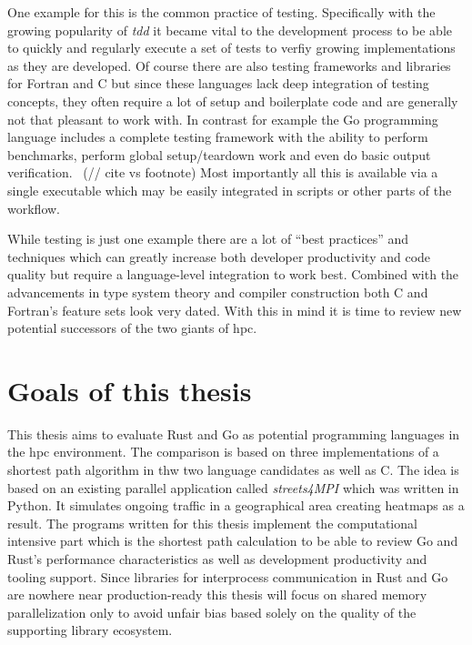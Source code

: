 One example for this is the common practice of testing. Specifically with the growing popularity of \textit{\gls{tdd}} it became vital to the development process to be able to quickly and regularly execute a set of tests to verfiy growing implementations as they are developed. Of course there are also testing frameworks and libraries for Fortran and C but since these languages lack deep integration of testing concepts, they often require a lot of setup and boilerplate code and are generally not that pleasant to work with. In contrast for example the Go programming language includes a complete testing framework with the ability to perform benchmarks, perform global setup/teardown work and even do basic output verification.~\cite{go_doc_testing} (// cite vs footnote) Most importantly all this is available via a single executable  which may be easily integrated in scripts or other parts of the workflow.

While testing is just one example there are a lot of ``best practices'' and techniques which can greatly increase both developer productivity and code quality but require a language-level integration to work best. Combined with the advancements in type system theory and compiler construction both C and Fortran's feature sets look very dated. With this in mind it is time to review new potential successors of the two giants of \gls{hpc}.

\section{Goals of this thesis}
\label{sec:Introduction::Goals}

This thesis aims to evaluate Rust and Go as potential programming languages in the \gls{hpc} environment. The comparison is based on three implementations of a shortest path algorithm in thw two language candidates as well as C. The idea is based on an existing parallel application called \textit{streets4MPI} which was written in Python. It simulates ongoing traffic in a geographical area creating heatmaps as a result. The programs written for this thesis implement the computational intensive part which is the shortest path calculation to be able to review Go and Rust's performance characteristics as well as development productivity and tooling support. Since libraries for interprocess communication in Rust and Go are nowhere near production-ready this thesis will focus on shared memory parallelization only to avoid unfair bias based solely on the quality of the supporting library ecosystem.


